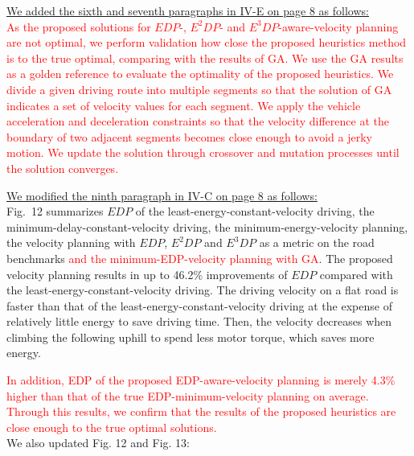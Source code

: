 \documentclass[onecolumn]{IEEEconf}
\begin{document}
\begin{description}
\uline{We added the sixth and seventh paragraphs in IV-E on page 8 as follows:}\\
\textcolor{red}{As the proposed solutions for  $EDP$-, $E^2DP$- and $E^3DP$-aware-velocity planning are not optimal, we perform  validation how close the proposed heuristics method is to the true optimal, comparing with the results of GA. We use the GA results as a golden reference to evaluate the optimality of the proposed heuristics.
We divide a given driving route into multiple segments so that the solution of GA indicates a set of velocity values for each segment. %
We apply the vehicle acceleration and deceleration constraints so that the velocity difference at the boundary of two adjacent segments becomes close enough to avoid a jerky motion. We update the solution through crossover and mutation processes until the solution converges.} 


\uline{We modified the ninth paragraph in IV-C on page 8 as follows:}\\
Fig.~12 summarizes $EDP$ of the least-energy-constant-velocity driving, the minimum-delay-constant-velocity driving, the minimum-energy-velocity planning, the velocity planning with $EDP$, $E^2DP$ and $E^3DP$ as a metric on the road benchmarks \textcolor{red}{and the minimum-EDP-velocity planning with GA}. The proposed velocity planning results in up to 46.2\% improvements of $EDP$ compared with the least-energy-constant-velocity driving. 
The driving velocity on a flat road is faster than that of the least-energy-constant-velocity driving at the expense of relatively little energy to save driving time. Then, the velocity decreases when climbing the following uphill to spend less motor torque, which saves more energy.

\textcolor{red}{In addition, EDP of the proposed EDP-aware-velocity planning is merely 4.3\% higher than that of the true EDP-minimum-velocity planning on average. Through this results, we confirm that the results of the proposed heuristics are close enough to the true optimal solutions.}\\

We also updated Fig. 12 and Fig. 13:


\end{description}
\end{document}
